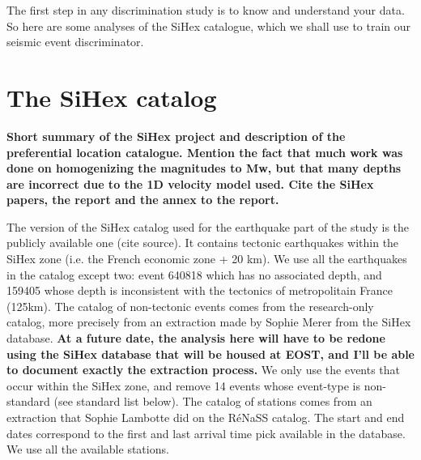 The first step in any discrimination study is to know and understand your
data. So here are some analyses of the SiHex catalogue, which we shall use to
train our seismic event discriminator.

\section{The SiHex catalog}
{\bf Short summary of the SiHex project and description of the preferential
location catalogue. Mention the fact that much work was done on homogenizing
the magnitudes to Mw, but that many depths are incorrect due to the 1D velocity
model used. Cite the SiHex papers, the report and the annex to the report.}

The version of the SiHex catalog used for the earthquake part of the study is
the publicly available one (cite source). It contains tectonic earthquakes
within the SiHex zone (i.e. the French economic zone + 20 km). We use all the
earthquakes in the catalog except two: event 640818 which has no associated
depth, and 159405 whose depth is inconsistent with the tectonics of
metropolitain France (125km).  
The catalog of non-tectonic events comes from the research-only catalog, more
precisely from an extraction made by Sophie Merer from the SiHex database.
{\bf At a future date, the analysis here will have to be redone using the SiHex
database that will be housed at EOST, and I'll be able to document exactly the
extraction process.} We only use the events that occur within the SiHex zone,
and remove 14 events whose event-type is non-standard (see standard list
below).  The catalog of stations comes from an extraction that Sophie Lambotte
did on the RéNaSS catalog. The start and end dates correspond to the first and
last arrival time pick available in the database. We use all the available
stations.

